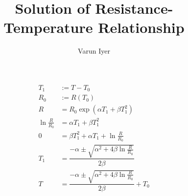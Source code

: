 \documentclass{article}
\title{Solution of Resistance-Temperature Relationship}
\author{Varun Iyer}
\begin{document}
\maketitle
\begin{align}
	T_1 &:= T - T_0 \\
	R_0 &:= R(T_0)\\
	R &= R_0 \exp (\alpha T_1 + \beta T_1 ^2)\\
	\ln \tfrac{R}{R_0} &= \alpha T_1 + \beta T_1 ^2\\
	0 &= \beta T_1 ^2 + \alpha T_1 + \ln \tfrac{R}{R_0} \\
	T_1 &= \dfrac{-\alpha \pm \sqrt{\alpha ^2 + 4 \beta \ln \tfrac{R}{R_0}}}{2\beta} \\
	T &= \boxed{\dfrac{-\alpha \pm \sqrt{\alpha ^2 + 4 \beta \ln \tfrac{R}{R_0}}}{2\beta} + T_0}
\end{align}
\end{document}
